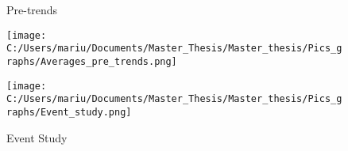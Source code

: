 \documentclass[11pt]{beamer}
\begin{document}
\begin{frame}
\begin{figure}[!ht]
\begin{center}
\begin{minipage}[t]{\textwidth}
\begin{minipage}[t]{0.5\linewidth}\caption{Pre-trends \label{Pre-trends}}
\texttt{[image: C:/Users/mariu/Documents/Master\_Thesis/Master\_thesis/Pics\_graphs/Averages\_pre\_trends.png]}\\
\end{minipage}\hfill%
\begin{minipage}[t]{0.5\linewidth}\caption{Event Study \label{Event Study}}
\texttt{[image: C:/Users/mariu/Documents/Master\_Thesis/Master\_thesis/Pics\_graphs/Event\_study.png]}\\
\end{minipage}\hfill%
\end{minipage}
\end{center}
\end{figure}

\end{frame}
\end{document}
